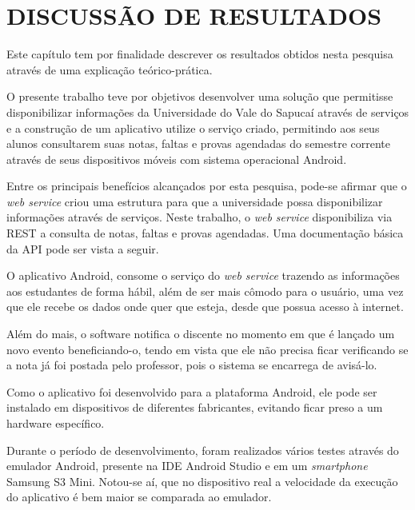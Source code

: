 
\chapter{DISCUSSÃO DE RESULTADOS} 

	\par Este capítulo tem por finalidade descrever os resultados obtidos nesta
pesquisa através de uma explicação teórico-prática.

	\par O presente trabalho teve por objetivos desenvolver uma solução que
permitisse disponibilizar informações da Universidade do Vale do Sapucaí
através de serviços e a construção de um aplicativo utilize o serviço criado,
permitindo aos seus alunos consultarem suas notas, faltas e provas agendadas do
semestre corrente através de seus dispositivos móveis com sistema operacional
Android.

	\par Entre os principais benefícios alcançados por esta pesquisa, pode-se
afirmar que o \textit{web service} criou uma estrutura para que a universidade
possa disponibilizar informações através de serviços. Neste trabalho, o
\textit{web service} disponibiliza via REST a consulta de notas, faltas e
provas agendadas. Uma documentação básica da API pode ser vista a seguir.

	
	
	\par O aplicativo Android, consome o serviço do \textit{web service} trazendo
as informações aos estudantes de forma hábil, além de ser mais cômodo para o
usuário, uma vez que ele recebe os dados onde quer que esteja, desde que possua
acesso à internet.

	\par Além do mais, o software notifica o discente no momento em que é lançado
um novo evento beneficiando-o, tendo em vista que ele não precisa ficar
verificando se a nota já foi postada pelo professor, pois o sistema se
encarrega de avisá-lo.

	\par Como o aplicativo foi desenvolvido para a plataforma Android, ele pode ser
instalado em dispositivos de diferentes fabricantes, evitando ficar preso a um
hardware específico.

	\par Durante o período de desenvolvimento, foram realizados vários testes
através do emulador Android, presente na IDE Android Studio e em um
\textit{smartphone} Samsung S{3} Mini. Notou-se aí, que no dispositivo real a
velocidade da execução do aplicativo é bem maior se comparada ao emulador.

